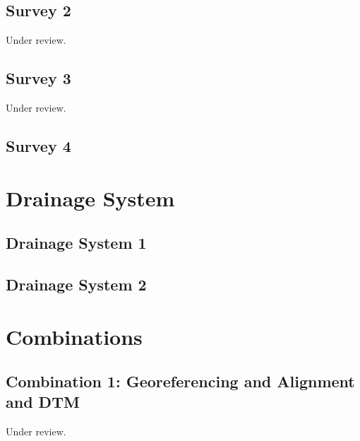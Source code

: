 \documentclass{scrartcl}
\begin{document}
\subsection{Survey 2} %
\label{sec:survey_2}
Under review.%
\clearpage

\subsection{Survey 3} %
\label{sec:survey_3}
Under review.%
\clearpage

\subsection{Survey 4} %
\label{sec:survey_4}
\clearpage


\section{Drainage System}
\label{sec:drainage_system}

\subsection{Drainage System 1}
\label{sec:drainage_1}
\clearpage

\subsection{Drainage System 2}
\label{sec:drainage_2}
\clearpage

\section{Combinations}
\label{sec:combinations}

\subsection{Combination 1: Georeferencing and Alignment and DTM} %
\label{sec:align_dtm_1}
Under review.%
\clearpage
\end{document}
